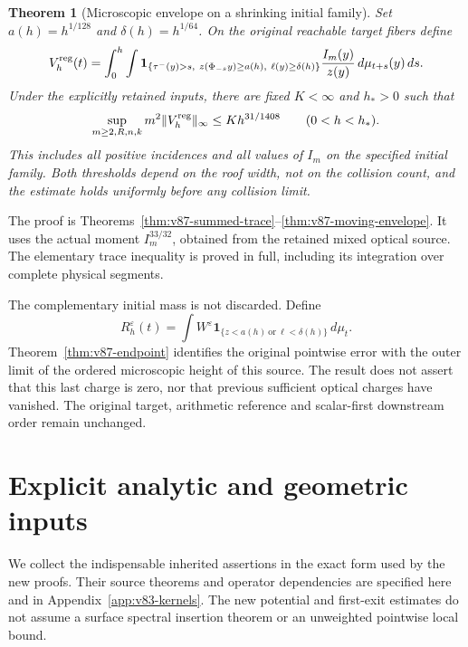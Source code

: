 \documentclass[11pt,reqno]{amsart}
\numberwithin{equation}{section}
\newtheorem{theorem}{Theorem}[section]
\theoremstyle{definition}
\theoremstyle{remark}\newtheorem{remark}[theorem]{Remark}
\newcommand{\one}{\mathbf1}\newcommand{\dd}{\,\mathrm d}
\begin{document}
\begin{theorem}[Microscopic envelope on a shrinking initial family]
\label{thm:v87-main}
Set $a(h)=h^{1/128}$ and $\delta(h)=h^{1/64}$. On the original
reachable target fibers define
\[
 V_h^{\rm reg}(t)=\int_0^h\int
  \one_{\{\tau^-(y)>s,\ z(\Phi_{-s}y)\ge a(h),\ \ell(y)\ge\delta(h)\}}
                      \frac{I_m(y)}{z(y)}\,d\mu_{t+s}(y)\,ds.
\]
Under the explicitly retained inputs, there are fixed $K<\infty$
and $h_*>0$ such that
\begin{equation}\label{eq:v87-main-envelope}
 \sup_{m\ge2,R,n,k}m^2\|V_h^{\rm reg}\|_\infty
                              \le Kh^{31/1408}\qquad(0<h<h_*).
\end{equation}
This includes all positive incidences and all values of $I_m$ on
the specified initial family. Both thresholds depend on the roof
width, not on the collision count, and the estimate holds uniformly
before any collision limit.
\end{theorem}
The proof is Theorems~\ref{thm:v87-summed-trace}--\ref{thm:v87-moving-envelope}.
It uses the actual moment $I_m^{33/32}$, obtained from the retained
mixed optical source. The elementary trace inequality is proved in
full, including its integration over complete physical segments.

The complementary initial mass is not discarded. Define
\[
 R_h^\varepsilon(t)=\int W^\varepsilon
            \one_{\{z<a(h)\ \mathrm{or}\ \ell<\delta(h)\}}\,d\mu_t.
\]
Theorem~\ref{thm:v87-endpoint} identifies the original pointwise error
with the outer limit of the ordered microscopic height of this source.
The result does not assert that this last charge is zero, nor that
previous sufficient optical charges have vanished. The original
target, arithmetic reference and scalar-first downstream order remain
unchanged.

\section{Explicit analytic and geometric inputs}
We collect the indispensable inherited assertions in the exact form
used by the new proofs. Their source theorems and operator dependencies
are specified here and in Appendix~\ref{app:v83-kernels}. The new
potential and first-exit estimates do not assume a surface spectral
insertion theorem or an unweighted pointwise local bound.
\end{document}
